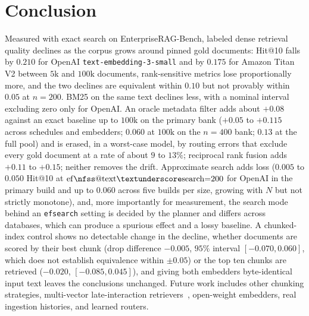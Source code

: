 \documentclass{ieeeaccess}
\makeatletter
\DeclareRobustCommand{\_}{\ifmmode\nfss@text{\textunderscore}\else\textunderscore\allowbreak\fi}
\makeatother
\begin{document}
\section{Conclusion}
\label{sec:conclusion}
Measured with exact search on EnterpriseRAG-Bench, labeled dense retrieval quality declines as the corpus grows around pinned gold documents: Hit@10 falls by $0.210$ for OpenAI \texttt{text-embedding-3-small} and by $0.175$ for Amazon Titan V2 between $5\text{k}$ and $100\text{k}$ documents, rank-sensitive metrics lose proportionally more, and the two declines are equivalent within $0.10$ but not provably within $0.05$ at $n{=}200$. BM25 on the same text declines less, with a nominal interval excluding zero only for OpenAI. An oracle metadata filter adds about $+0.08$ against an exact baseline up to $100\text{k}$ on the primary bank ($+0.05$ to $+0.115$ across schedules and embedders; $0.060$ at $100\text{k}$ on the $n{=}400$ bank; $0.13$ at the full pool) and is erased, in a worst-case model, by routing errors that exclude every gold document at a rate of about $9$ to $13\%$; reciprocal rank fusion adds $+0.11$ to $+0.15$; neither removes the drift. Approximate search adds loss ($0.005$ to $0.050$ Hit@10 at $\mathrm{ef\_search}{=}200$ for OpenAI in the primary build and up to $0.060$ across five builds per size, growing with $N$ but not strictly monotone), and, more importantly for measurement, the search mode behind an \texttt{ef\_search} setting is decided by the planner and differs across databases, which can produce a spurious effect and a lossy baseline. A chunked-index control shows no detectable change in the decline, whether documents are scored by their best chunk (drop difference $-0.005$, $95\%$ interval $[-0.070,0.060]$, which does not establish equivalence within $\pm0.05$) or the top ten chunks are retrieved ($-0.020$, $[-0.085,0.045]$), and giving both embedders byte-identical input text leaves the conclusions unchanged. Future work includes other chunking strategies, multi-vector late-interaction retrievers~\cite{khattab2020colbert}, open-weight embedders, real ingestion histories, and learned routers.

\appendices
\end{document}
